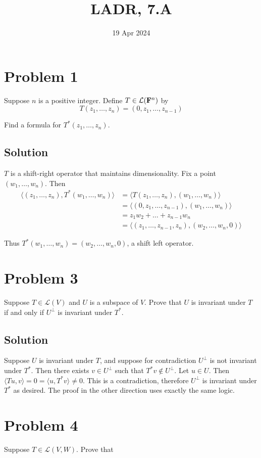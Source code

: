 \documentclass{article}
\title{LADR, 7.A}
\date{19 Apr 2024}
\begin{document}
\maketitle

\section*{Problem 1}
Suppose $n$ is a positive integer. Define $T\in\mathcal{L}(\mathbf{F}^n)$ by
\[T(z_1,\ldots,z_n)=(0,z_1,\ldots,z_{n-1})\]

Find a formula for $T^*(z_1,\ldots,z_n)$.

\subsection*{Solution}
$T$ is a shift-right operator that maintains dimensionality. Fix a point $(w_1, \ldots, w_n)$. Then
\begin{align*}
    \langle (z_1,\ldots,z_n), T^*(w_1, \ldots, w_n) \rangle&=\langle T(z_1,\ldots,z_n), (w_1, \ldots, w_n) \rangle\\
    &=\langle (0, z_1,\ldots,z_{n-1}), (w_1, \ldots, w_n) \rangle\\
    &=z_1w_2+\ldots+z_{n-1}w_n\\
    &=\langle (z_1,\ldots,z_{n-1}, z_n), (w_2,\ldots,w_n, 0) \rangle
\end{align*}

Thus $T^*(w_1, \ldots, w_n)=(w_2,\ldots,w_n, 0)$, a shift left operator.

\section*{Problem 3}
Suppose $T\in\mathcal{L}(V)$ and $U$ is a subspace of $V$. Prove that $U$ is invariant under $T$ if and only if $U^\perp$ is invariant under $T^*$.

\subsection*{Solution}
Suppose $U$ is invariant under $T$, and suppose for contradiction $U^\perp$ is not invariant under $T^*$. Then there exists $v\in U^\perp$ such that $T^*v\not\in U^\perp$. Let $u\in U$. Then $\langle Tu,v\rangle=0=\langle u, T^*v \rangle\neq 0$. This is a contradiction, therefore $U^\perp$ is invariant under $T^*$ as desired. The proof in the other direction uses exactly the same logic.

\section*{Problem 4}
Suppose $T\in\mathcal{L}(V,W)$. Prove that
\end{document}
